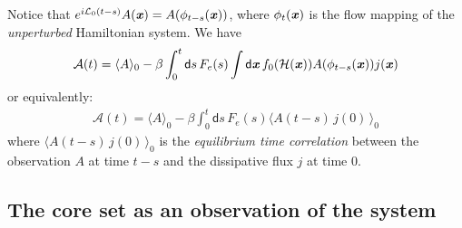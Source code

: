 \documentclass[aip,jcp,a4paper,reprint,onecolumn]{revtex4-1}
\newcommand{\vect}[1]{\textbf{\textit{#1}}}
\newcommand{\dd}{\textsf{d}}
\newcommand{\mh}{\mathcal H}
\newcommand{\ml}{\mathcal L}
\begin{document}
Notice that $e^{i\ml_0(t-s)}A(\vect x) = A(\phi_{t-s}(\vect x))$,
where $\phi_t(\vect x)$ is the flow mapping of the \emph{unperturbed}
Hamiltonian system. We have
\begin{align}
  \mathcal A(t)
  =
  \langle A\rangle_0
  -
  \beta
  \int_0^t\dd s\,
  F_e(s)
  \int \dd \vect x\,
  f_0(\mh(\vect x))
  A(\phi_{t-s}(\vect x))
  j(\vect x)  
\end{align}
or equivalently:
\begin{align}\label{eqn:lr}
  \mathcal A(t)
  =
  \langle A\rangle_0
  -
  \beta
  \int_0^t\dd s\,
  F_e(s)
  \langle
  A(t-s)\,
  j(0)\,
  \rangle_0
\end{align}
where $\langle A(t-s)\,j(0)\,\rangle_0$ is the \emph{equilibrium time
  correlation} between the observation $A$ at time $t-s$ and the
dissipative flux $j$ at time 0.


\subsection{The core set as an observation of the system}
\end{document}
